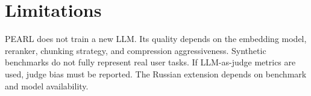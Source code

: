 \section{Limitations}

PEARL does not train a new LLM. Its quality depends on the embedding model,
reranker, chunking strategy, and compression aggressiveness. Synthetic
benchmarks do not fully represent real user tasks. If LLM-as-judge metrics are
used, judge bias must be reported. The Russian extension depends on benchmark
and model availability.
